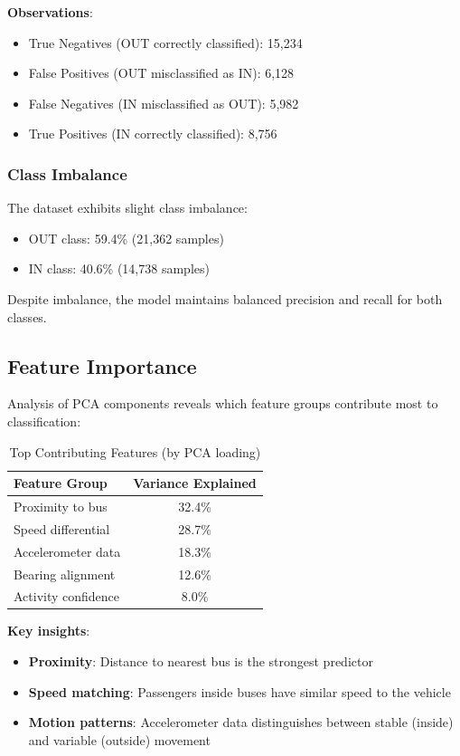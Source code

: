 \textbf{Observations}:
\begin{itemize}
    \item True Negatives (OUT correctly classified): 15,234
    \item False Positives (OUT misclassified as IN): 6,128
    \item False Negatives (IN misclassified as OUT): 5,982
    \item True Positives (IN correctly classified): 8,756
\end{itemize}

\subsubsection{Class Imbalance}

The dataset exhibits slight class imbalance:
\begin{itemize}
    \item OUT class: 59.4\% (21,362 samples)
    \item IN class: 40.6\% (14,738 samples)
\end{itemize}

Despite imbalance, the model maintains balanced precision and recall for both classes.

\subsection{Feature Importance}

Analysis of PCA components reveals which feature groups contribute most to classification:

\begin{table}[h]
\centering
\caption{Top Contributing Features (by PCA loading)}
\begin{tabular}{lc}
\toprule
\textbf{Feature Group} & \textbf{Variance Explained} \\
\midrule
Proximity to bus & 32.4\% \\
Speed differential & 28.7\% \\
Accelerometer data & 18.3\% \\
Bearing alignment & 12.6\% \\
Activity confidence & 8.0\% \\
\bottomrule
\end{tabular}
\label{tab:features}
\end{table}

\textbf{Key insights}:
\begin{itemize}
    \item \textbf{Proximity}: Distance to nearest bus is the strongest predictor
    \item \textbf{Speed matching}: Passengers inside buses have similar speed to the vehicle
    \item \textbf{Motion patterns}: Accelerometer data distinguishes between stable (inside) and variable (outside) movement
\end{itemize}

